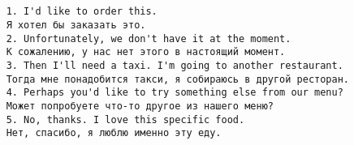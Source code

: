 \subsection*{}
\begin{verbatim}
    1. I'd like to order this.
    Я хотел бы заказать это.
    2. Unfortunately, we don't have it at the moment.
    К сожалению, у нас нет этого в настоящий момент.
    3. Then I'll need a taxi. I'm going to another restaurant.
    Тогда мне понадобится такси, я собираюсь в другой ресторан.
    4. Perhaps you'd like to try something else from our menu?
    Может попробуете что-то другое из нашего меню?
    5. No, thanks. I love this specific food.
    Нет, спасибо, я люблю именно эту еду.
\end{verbatim}